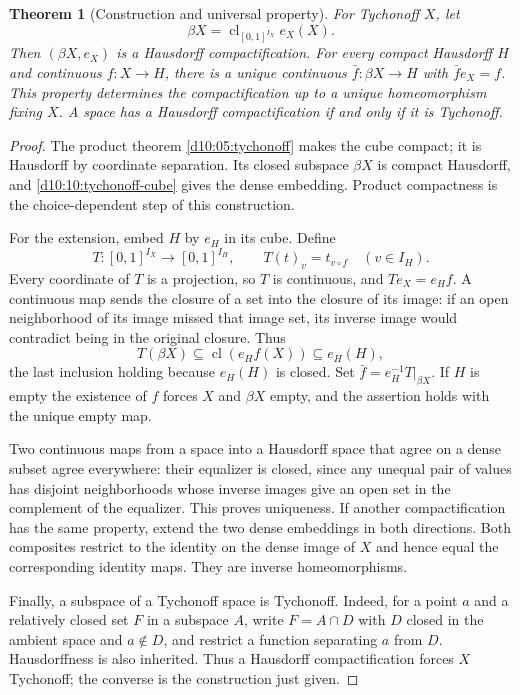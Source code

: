 \documentclass[11pt,oneside,openany]{book}
\newtheorem{theorem}{Theorem}[chapter]
\theoremstyle{definition}
\theoremstyle{remark}
\DeclareMathOperator{\cl}{cl}
\begin{document}
\begin{theorem}[Construction and universal property]\label{d10:11:stone-cech}
For Tychonoff $X$, let
\[
 \beta X=\cl_{[0,1]^{I_X}} e_X(X).
\]
Then $(\beta X,e_X)$ is a Hausdorff compactification. For every compact Hausdorff $H$ and continuous $f:X\to H$, there is a unique continuous $\bar f:\beta X\to H$ with $\bar f e_X=f$. This property determines the compactification up to a unique homeomorphism fixing $X$. A space has a Hausdorff compactification if and only if it is Tychonoff.
\end{theorem}
\begin{proof}
The product theorem \cref{d10:05:tychonoff} makes the cube compact; it is Hausdorff by coordinate separation. Its closed subspace $\beta X$ is compact Hausdorff, and \cref{d10:10:tychonoff-cube} gives the dense embedding. Product compactness is the choice-dependent step of this construction.

For the extension, embed $H$ by $e_H$ in its cube. Define
\[
 T:[0,1]^{I_X}\longrightarrow[0,1]^{I_H},\qquad
 T(t)_v=t_{v\circ f}\quad(v\in I_H).
\]
Every coordinate of $T$ is a projection, so $T$ is continuous, and $Te_X=e_Hf$. A continuous map sends the closure of a set into the closure of its image: if an open neighborhood of its image missed that image set, its inverse image would contradict being in the original closure. Thus
\[
 T(\beta X)\subseteq\cl(e_Hf(X))\subseteq e_H(H),
\]
the last inclusion holding because $e_H(H)$ is closed. Set $\bar f=e_H^{-1}T|_{\beta X}$. If $H$ is empty the existence of $f$ forces $X$ and $\beta X$ empty, and the assertion holds with the unique empty map.

Two continuous maps from a space into a Hausdorff space that agree on a dense subset agree everywhere: their equalizer is closed, since any unequal pair of values has disjoint neighborhoods whose inverse images give an open set in the complement of the equalizer. This proves uniqueness. If another compactification has the same property, extend the two dense embeddings in both directions. Both composites restrict to the identity on the dense image of $X$ and hence equal the corresponding identity maps. They are inverse homeomorphisms.

Finally, a subspace of a Tychonoff space is Tychonoff. Indeed, for a point $a$ and a relatively closed set $F$ in a subspace $A$, write $F=A\cap D$ with $D$ closed in the ambient space and $a\notin D$, and restrict a function separating $a$ from $D$. Hausdorffness is also inherited. Thus a Hausdorff compactification forces $X$ Tychonoff; the converse is the construction just given.
\end{proof}
\end{document}
